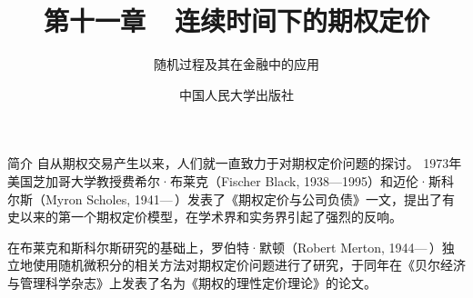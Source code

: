\documentclass[t]{beamer}
\begin{document}
\fontsize{11}{18}\selectfont


\CTEXindent



  \title{第十一章~~连续时间下的期权定价}
\author{随机过程及其在金融中的应用}
\date{中国人民大学出版社}
  \begin{frame}
    \maketitle
  \end{frame}

\begin{frame}{简介}
	自从期权交易产生以来，人们就一直致力于对期权定价问题的探讨。
	1973年美国芝加哥大学教授费希尔·布莱克（Fischer Black, 1938---1995）和迈伦·斯科尔斯（Myron  Scholes, 1941---\,）发表了《期权定价与公司负债》一文，提出了有史以来的第一个期权定价模型，在学术界和实务界引起了强烈的反响。
	
	在布莱克和斯科尔斯研究的基础上，罗伯特·默顿（Robert Merton, 1944---\,）独立地使用随机微积分的相关方法对期权定价问题进行了研究，于同年在《贝尔经济与管理科学杂志》上发表了名为《期权的理性定价理论》的论文。
\end{frame}
\end{document}
